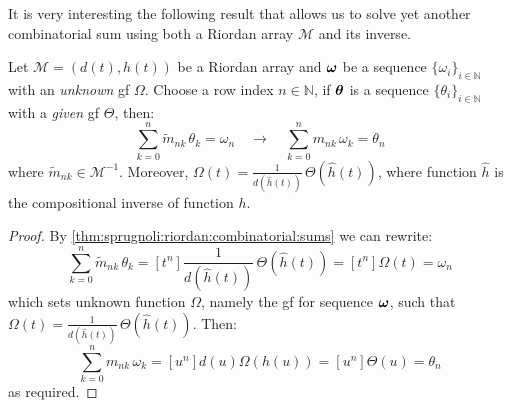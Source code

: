 It is very interesting the following result that allows us to solve
yet another combinatorial sum using both a Riordan array $\mathcal{M}$
and its inverse.

\begin{theorem}
    Let $\mathcal{M}=(d(t),h(t))$ be a Riordan array and $\boldsymbol{\omega}$ 
    be a sequence $\lbrace\omega_{i}\rbrace_{i\in\mathbb{N}}$ with an \emph{unknown} 
    \ac{gf} $\Omega$. Choose a row index $n\in\mathbb{N}$, if $\boldsymbol{\theta}$ is a  
    sequence $\lbrace\theta_{i}\rbrace_{i\in\mathbb{N}}$ with a \emph{given} \ac{gf} $\Theta$, 
    then:
    \begin{displaymath}
        \sum_{k=0}^{n}{\tilde{m}_{nk}\,\theta_{k}}=\omega_{n}
        \quad\rightarrow\quad 
        \sum_{k=0}^{n}{m_{nk}\,\omega_{k}}=\theta_{n}
    \end{displaymath}
    where $\tilde{m}_{nk}\in\mathcal{M}^{-1}$. Moreover, 
    $\Omega(t)=\frac{1}{d(\hat{h}(t))}\,\Theta(\hat{h}(t))$,
    where function $\hat{h}$ is the compositional inverse of 
    function $h$.
    \label{thm:sprugnoli:sequences:inversion:by:combinatorial:sums}
\end{theorem}

\begin{proof}
    By \autoref{thm:sprugnoli:riordan:combinatorial:sums} we can rewrite:
    \begin{displaymath}
        \sum_{k=0}^{n}{\tilde{m}_{nk}\,\theta_{k}}
            = [t^{n}]\frac{1}{d(\hat{h}(t))}\,\Theta(\hat{h}(t)) 
            = [t^{n}]\Omega(t) = \omega_{n}
    \end{displaymath}
    which sets unknown function $\Omega$, namely the \ac{gf} for 
    sequence $\boldsymbol{\omega}$, such that $\Omega(t)=\frac{1}{d(\hat{h}(t))}\,\Theta(\hat{h}(t))$. 
    Then:
    \begin{displaymath}
        \sum_{k=0}^{n}{m_{nk}\,\omega_{k}}
            = [u^{n}]d(u)\Omega(h(u))
            = [u^{n}]\Theta(u)
            = \theta_{n}
    \end{displaymath}
    as required.
\end{proof}

